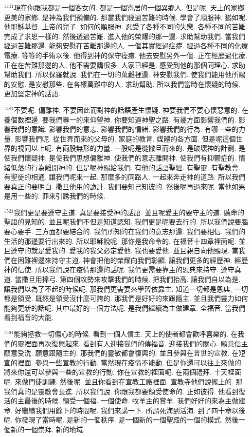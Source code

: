 \documentclass{book}
\begin{document}
$^{1441}$現在你跟我都是一個客女的.
都是一個寄居的一個異鄉人.
但是呢.
天上的家鄉.
更美的家鄉.
是神為我們預備的.
那當我們經過苦難的時候.
學會了順服神.
猶如呢.
他耶穌基督.
上帝的兒子.
如何的順服神.
忍受了各種不同的失戀.
各種不同的苦難.
完成了求恩一樣的.
然後透過苦難.
進入他的榮耀的那一邊.
求助幫助我們.
當我們經過苦難那邊.
能夠安慰在苦難那邊的人.
一個其實經過癌症.
經過各種不同的化療電療.
等等的手術以後.
他得到神的保守痊癒.
他去安慰另外一個.
正在經歷過化療.
正在在苦難那邊的人.
他不需要講很多.
人家已經是.
感受到他的那個同理心.
求助幫助我們.
所以保羅就說.
我們在一切的萬難裡邊.
神安慰我們.
使我們能用他所賜的安慰.
是安慰那些.
在各樣萬難中的人.
求助幫助.
所以我們當時在懷疑的時候.
更加堅定神的話語.

$^{1481}$不要呢.
偏離神.
不要因此而對神的話語產生懷疑.
神要我們不要心懷惡意的.
在養個數裡邊.
要我們專一的來仰望神.
你要知道神聖之路.
有幾方面影響我們的.
影響我們的意識.
影響我們的意志.
影響我們的情緒.
影響我們的行為.
有哪一些的力量.
影響我們呢.
從世界而來的父母的.
家庭的教育.
媒體的各方面.
但是呢這個世界的視同以上呢.
有兩股無形的力量.
一股呢是從撒旦而來的.
是破壞神的計劃.
是使我們懷疑神.
是使我們思想偏離神.
使我們的意志離開神.
使我們有抑鬱症的.
情緒低落的行為離開神的.
但是呢神賜給我們.
有他的話語聖經.
有聖靈.
有聖教會.
有聖徒的相通.
讓我們呢來一起.
那麼多的同路人.
一起來奔走神的道路.
所以我們要真正的要明白.
撒旦他用的詭計.
我們要知己知彼的.
然後呢再過來呢.
當他如果是用一些的.
罪來引誘我們的時候.

$^{1521}$我們更是要遵守主道.
真是要接受神的話語.
並且呢愛主的要守主的道.
聽命的聖語的見知的.
並且呢我們不但是知道認知.
我們更是呢要去行的.
所以我們說要腦要心要手.
三方面都要結合的.
我們所知的在我們的意志那邊.
我們要相信.
我們的生活的那邊要行出來的.
所以耶穌說呢.
那你是我命令的.
在福音十四章裡面呢.
並且遵守的就是愛我的.
愛我的我父必定愛他.
我也要愛他.
並且親自向他顯現.
當我們在困難裡邊來持守主道.
神會把他的榮耀向我們彰顯.
讓我們更多的經歷神.
經歷神的信使.
所以我們說在疫情那邊的話呢.
我們更需要靠主的恩典來持守.
遵守真道.
當撒旦用捧弓.
第四個攻勢來攻擊我們的時候.
把我們抬高.
讓我們自以為是.
讓我們以為了不起的時候呢.
那我們更需要來學習依靠主.
知道一切都是恩典.
一切都是領受.
既然是領受沒什麼可誇的.
那我們是好好的來跟隨主.
並且我們靈力如何能夠更新的話呢.
其中最好的一個方法呢.
是我們繼續為主做建章.
全福音.
當我們看到福音的大能.

$^{1561}$能夠拯救一切傷心的時候.
看到一個人信主.
天上的使者都會歡呼喜樂的.
在我們的靈裡面再次復興起來.
看到有人迎接我們的傳福音.
迎接我們的關心.
願意信主願意受洗.
願意跟隨主的.
那我們的靈敏都會復興的.
並且參與在普世的宣教.
在短宣的裡面.
參與一些宣教的行動.
當然現在疫情不能動.
但是你還可以往上來做的.
將來你還可以參與一些的宣教的行動.
你在宣教的裡面呢.
在兩個禮拜.
十天裡面呢.
來做門徒訓練.
然後呢.
並且你看到在宣教工廠裡面.
宣教寺他們說擺上的.
那我們真的是靈敏會長進.
所以我們說.
你跟我都要領受使命的.
正如彼得.
他看到復活的主最後的時候.
領受一個福.
一個使命.
牧羊主的賞羊.
我們好好的來為主做建章.
好繼續我們用餘下的時間呢.
我們來講一下.
所謂死海到活海.
到了四十章以後呢.
你發現了當時呢.
是新的一個秩序.
是一個新的一個聖殿的一個的模式.
然後一個新的一個崇拜.
新的地域.
\end{document}
